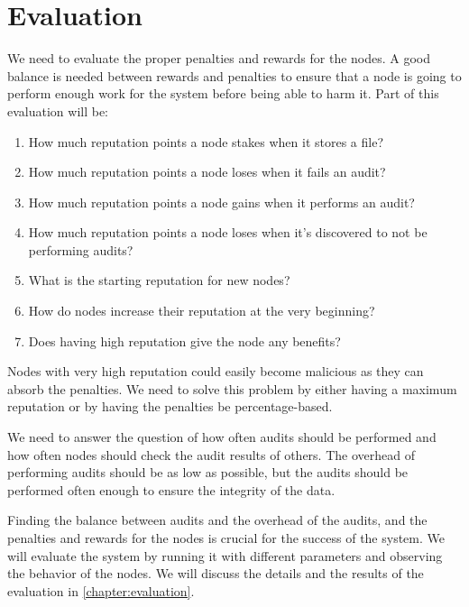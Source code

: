 \label{chapter:evaluation}
\chapter{Evaluation}

We need to evaluate the proper penalties and rewards for the nodes.
A good balance is needed between rewards and penalties to ensure that a node is
going to perform enough work for the system before being able to harm it.
Part of this evaluation will be:
\begin{enumerate}
    \item How much reputation points a node stakes when it stores a file?
    \item How much reputation points a node loses when it fails an audit?
    \item How much reputation points a node gains when it performs an audit?
    \item How much reputation points a node loses when it's discovered to not be performing audits?
    \item What is the starting reputation for new nodes?
    \item How do nodes increase their reputation at the very beginning?
    \item Does having high reputation give the node any benefits?
\end{enumerate}

Nodes with very high reputation could easily become malicious as they can absorb the penalties.
We need to solve this problem by either having a maximum reputation or by having the penalties be
percentage-based.

We need to answer the question of how often audits should be performed and how often nodes should
check the audit results of others.
The overhead of performing audits should be as low as possible, but the audits should be performed often enough
to ensure the integrity of the data.

Finding the balance between audits and the overhead of the audits, and the penalties and rewards for the nodes
is crucial for the success of the system.
We will evaluate the system by running it with different parameters and observing the behavior of the nodes.
We will discuss the details and the results of the evaluation in \ref{chapter:evaluation}.
